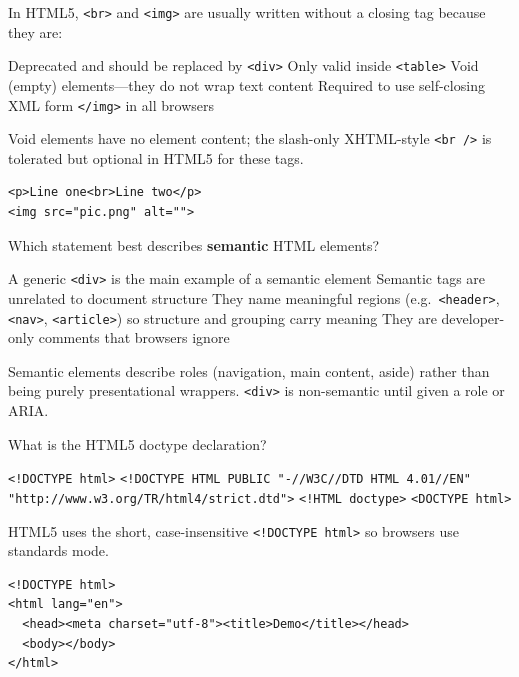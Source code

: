 \question[4]
In HTML5, \texttt{<br>} and \texttt{<img>} are usually written without a closing tag because they are:
\begin{choices}
  \choice Deprecated and should be replaced by \texttt{<div>}
  \choice Only valid inside \texttt{<table>}
  \CorrectChoice Void (empty) elements---they do not wrap text content
  \choice Required to use self-closing XML form \texttt{</img>} in all browsers
\end{choices}
\begin{solution}
  Void elements have no element content; the slash-only XHTML-style \texttt{<br />} is tolerated but optional in HTML5 for these tags.
\begin{lstlisting}[style=htmlexam]
<p>Line one<br>Line two</p>
<img src="pic.png" alt="">
\end{lstlisting}
\end{solution}

\question[4]
Which statement best describes \textbf{semantic} HTML elements?
\begin{choices}
  \choice A generic \texttt{<div>} is the main example of a semantic element
  \choice Semantic tags are unrelated to document structure
  \CorrectChoice They name meaningful regions (e.g.\ \texttt{<header>}, \texttt{<nav>}, \texttt{<article>}) so structure and grouping carry meaning
  \choice They are developer-only comments that browsers ignore
\end{choices}
\begin{solution}
  Semantic elements describe roles (navigation, main content, aside) rather than being purely presentational wrappers. \texttt{<div>} is non-semantic until given a role or ARIA.
\end{solution}

\question[4]
What is the HTML5 doctype declaration?
\begin{choices}
  \CorrectChoice \texttt{<!DOCTYPE html>}
  \choice \texttt{<!DOCTYPE HTML PUBLIC "-//W3C//DTD HTML 4.01//EN" "http://www.w3.org/TR/html4/strict.dtd">}
  \choice \texttt{<!HTML doctype>}
  \choice \texttt{<DOCTYPE html>}
\end{choices}
\begin{solution}
  HTML5 uses the short, case-insensitive \texttt{<!DOCTYPE html>} so browsers use standards mode.
\begin{lstlisting}[style=htmlexam]
<!DOCTYPE html>
<html lang="en">
  <head><meta charset="utf-8"><title>Demo</title></head>
  <body></body>
</html>
\end{lstlisting}
\end{solution}

